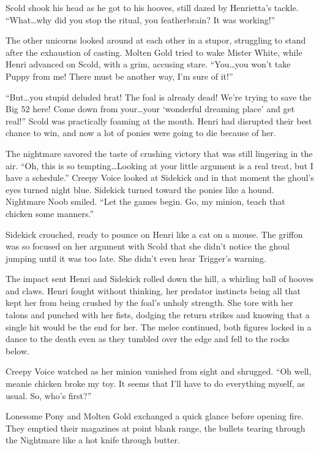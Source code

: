 Scold shook his head as he got to his hooves, still dazed by Henrietta's tackle. ``What\dots why did you stop the ritual, you featherbrain? It was working!''

The other unicorns looked around at each other in a stupor, struggling to stand after the exhaustion of casting. Molten Gold tried to wake Mister White, while Henri advanced on Scold, with a grim, accusing stare. ``You\dots you won't take Puppy from me! There must be another way, I'm sure of it!''

``But\dots you stupid deluded brat! The foal is already dead! We're trying to save the Big 52 here! Come down from your\dots your `wonderful dreaming place' and get real!'' Scold was practically foaming at the mouth. Henri had disrupted their best chance to win, and now a lot of ponies were going to die because of her.

The nightmare savored the taste of crushing victory that was still lingering in the air. ``Oh, this is so tempting\dots Looking at your little argument is a real treat, but I have a schedule.'' Creepy Voice looked at Sidekick and in that moment the ghoul's eyes turned night blue. Sidekick turned toward the ponies like a hound. Nightmare Noob smiled. ``Let the games begin. Go, my minion, teach that chicken some manners.''

Sidekick crouched, ready to pounce on Henri like a cat on a mouse. The griffon was so focused on her argument with Scold that she didn't notice the ghoul jumping until it was too late. She didn't even hear Trigger's warning.

The impact sent Henri and Sidekick rolled down the hill, a whirling ball of hooves and claws. Henri fought without thinking, her predator instincts being all that kept her from being crushed by the foal's unholy strength. She tore with her talons and punched with her fists, dodging the return strikes and knowing that a single hit would be the end for her. The melee continued, both figures locked in a dance to the death even as they tumbled over the edge and fell to the rocks below.

Creepy Voice watched as her minion vanished from sight and shrugged. ``Oh well, meanie chicken broke my toy. It seems that I'll have to do everything myself, as usual. So, who's first?''

Lonesome Pony and Molten Gold exchanged a quick glance before opening fire. They emptied their magazines at point blank range, the bullets tearing through the Nightmare like a hot knife through butter.


